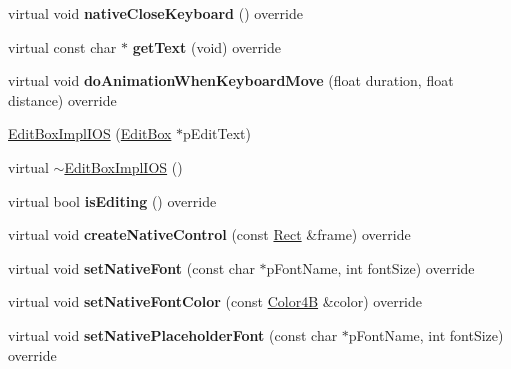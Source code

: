 \begin{DoxyCompactItemize}
\mbox{\label{classui_1_1EditBoxImplIOS_a5f63fd44b917e2f03c310db2ec9bfadc}} 
virtual void {\bfseries native\+Close\+Keyboard} () override
\item 
\mbox{\label{classui_1_1EditBoxImplIOS_a7400dc8191cb3a87fa6d38704ec549e4}} 
virtual const char $\ast$ {\bfseries get\+Text} (void) override
\item 
\mbox{\label{classui_1_1EditBoxImplIOS_aa3a057a4ec3977ce4493c67561e70743}} 
virtual void {\bfseries do\+Animation\+When\+Keyboard\+Move} (float duration, float distance) override
\item 
\hyperlink{classui_1_1EditBoxImplIOS_a3beb5f89d2ac3c58a021d744c89bfb01}{Edit\+Box\+Impl\+I\+OS} (\hyperlink{classui_1_1EditBox}{Edit\+Box} $\ast$p\+Edit\+Text)
\item 
virtual \hyperlink{classui_1_1EditBoxImplIOS_a377970f5d2e581a05d1e9e08ba46035c}{$\sim$\+Edit\+Box\+Impl\+I\+OS} ()
\item 
\mbox{\label{classui_1_1EditBoxImplIOS_af80ec66cea5d6e3287093394e6e01fa3}} 
virtual bool {\bfseries is\+Editing} () override
\item 
\mbox{\label{classui_1_1EditBoxImplIOS_a61b20cdd0e9dfbf4df758813441a370f}} 
virtual void {\bfseries create\+Native\+Control} (const \hyperlink{classRect}{Rect} \&frame) override
\item 
\mbox{\label{classui_1_1EditBoxImplIOS_af7a1d071bff74bc651baf8c8fd706e03}} 
virtual void {\bfseries set\+Native\+Font} (const char $\ast$p\+Font\+Name, int font\+Size) override
\item 
\mbox{\label{classui_1_1EditBoxImplIOS_add70f016391fcdb6863621810660aa05}} 
virtual void {\bfseries set\+Native\+Font\+Color} (const \hyperlink{structColor4B}{Color4B} \&color) override
\item 
\mbox{\label{classui_1_1EditBoxImplIOS_a44fb4816e06e2077b3b9aee46c3e543f}} 
virtual void {\bfseries set\+Native\+Placeholder\+Font} (const char $\ast$p\+Font\+Name, int font\+Size) override
\item 

\end{DoxyCompactItemize}
